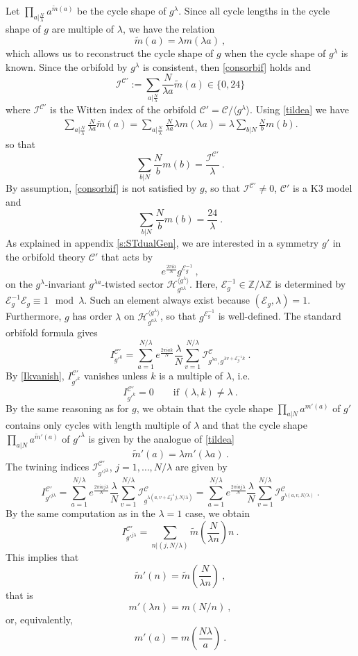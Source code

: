 \documentclass[a4paper,11pt]{article}
\newcommand{\ZZ}{\mathbb{Z}}
\newcommand{\C}{\mathcal{C}}
\newcommand{\E}{\mathcal{E}}
\newcommand{\Hh}{\mathcal{H}}
\newcommand{\I}{\mathcal{I}}
\numberwithin{equation}{section}
\def\be{\begin{equation}}
\def\ee{\end{equation}}
\begin{document}
Let $\prod_{a|\frac{N}{\lambda}} a^{\tilde m(a)}$ be the cycle shape of $g^\lambda$. Since all cycle lengths in the cycle shape of $g$ are multiple of $\lambda$, we have the relation
\be\label{tildea} \tilde m(a)=\lambda m(\lambda a)\ ,
\ee which allows us to reconstruct the cycle shape of $g$ when the cycle shape of $g^\lambda$ is known. Since the orbifold by $g^\lambda$ is consistent, then \eqref{consorbif} holds and
\be \I^{\C'}:= \sum_{a|\frac{N}{\lambda}}\frac{N}{\lambda a}\tilde m(a)\in  \{0,24\}
\ee where $\I^{\C'}$ is the Witten index of the orbifold $\C'=\C/\langle g^\lambda \rangle$. Using \eqref{tildea} we have
\begin{align}
\sum_{a|\frac{N}{\lambda}}\frac{N}{\lambda a}\tilde m(a)= \sum_{a|\frac{N}{\lambda}}\frac{N}{\lambda a} \lambda m(\lambda a)=\lambda \sum_{b|N}\frac{N}{b}m(b).
\end{align} so that
\be \sum_{b|N}\frac{N}{b}m(b)=\frac{\I^{\C'}}{\lambda}\ .
\ee By assumption, \eqref{consorbif} is not satisfied by $g$, so that $\I^{\C'}\neq 0$, $\C'$ is a K3 model and
\be \sum_{b|N}\frac{N}{b}m(b)=\frac{24}{\lambda}\ .
\ee
As explained in appendix \ref{s:STdualGen}, we are interested in a symmetry $g'$ in the orbifold theory $\C'$ that acts by
\be e^{\frac{2\pi i a}{N}}g^{\E_g^{-1}}\ ,
\ee on the $g^\lambda$-invariant $g^{\lambda a}$-twisted sector $\Hh_{g^{a\lambda}}^{\langle g^\lambda\rangle}$. Here, $\E_g^{-1}\in \ZZ/\lambda\ZZ$ is determined by $\E_g^{-1} \E_g\equiv 1\mod \lambda$. Such an element always exist because $(\E_g,\lambda)=1$. Furthermore, $g$ has order $\lambda$ on $\Hh_{g^{a\lambda}}^{\langle g^\lambda\rangle}$, so that $g^{\E_g^{-1}}$ is well-defined. The standard orbifold formula gives
\be I_{g'^k}^{\C'}=\sum_{a=1}^{N/\lambda} e^{\frac{2\pi i a k}{N}}\frac{\lambda}{N}\sum_{v=1}^{N/\lambda}\I^{\C}_{g^{\lambda a},g^{\lambda v+\E_g^{-1}k}}\ .
\ee By \eqref{Ikvanish}, $I_{{g'}^k}^{\C'}$ vanishes unless $k$ is a multiple of $\lambda$, i.e.
\be I_{g'^k}^{\C'}=0\qquad \text{if }(\lambda, k)\neq \lambda\ .
\ee By the same reasoning as for $g$, we obtain that the cycle shape $\prod_{a|N} a^{m'(a)}$ of $g'$ contains only cycles with length multiple of $\lambda$ and that the cycle shape $\prod_{a|N} a^{\tilde m'(a)}$ of ${g'}^\lambda$  is given by the analogue of \eqref{tildea}
\be \tilde m'(a)=\lambda m'(\lambda a)\ .
\ee The twining indices $\I^{\C'}_{g'^{j\lambda}}$, $j=1,\ldots,N/\lambda$ are given by
\be I_{g'^{j\lambda}}^{\C'}=\sum_{a=1}^{N/\lambda} e^{\frac{2\pi i a j\lambda}{N}}\frac{\lambda}{N}\sum_{v=1}^{N/\lambda}\I^{\C}_{g^{\lambda (a,v+\E_g^{-1}j,N/\lambda)}}=\sum_{a=1}^{N/\lambda} e^{\frac{2\pi i a j\lambda}{N}}\frac{\lambda}{N}\sum_{v=1}^{N/\lambda}\I^{\C}_{g^{\lambda (a,v,N/\lambda)}}\ .
\ee
By the same computation as in the $\lambda=1$ case, we obtain
\be I_{g'^{j\lambda}}^{\C'}=\sum_{n|(j,N/\lambda)}\tilde m(\frac{N}{\lambda n})n\ .\ee
This implies that
\be \tilde m'(n)=\tilde m(\frac{N}{\lambda n})\ ,
\ee that is
\be m'(\lambda n)=m(N/n)\ ,
\ee or, equivalently,
\be m'(a)=m(\frac{N\lambda}{a})\ .
\ee
\end{document}
